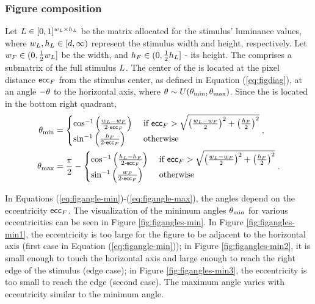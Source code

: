 \subsubsection{Figure composition}
\label{sec:figure-composition}

Let $L \in [0, 1]^{w_L \times h_L}$ be the matrix allocated for the stimulus' luminance values, where $w_L, h_L \in [d, \infty)$ represent the stimulus width and height, respectively.
Let ${w_F} \in (0, \frac{1}{2} w_L]$ be the \stimfig{} width, and ${h_F} \in (0, \frac{1}{2} h_L]$ - its height. The \stimfig{} comprises a submatrix of the full stimulus $L$. The center of the \stimfig{} is located at the pixel distance $\mathsf{ecc}_F$ from the stimulus center, as defined in Equation (\ref{eq:figdiag}), at an angle $-\theta$ to the horizontal axis, where $\theta \sim U(\theta_{\min}, \theta_{\max})$. Since the \stimfig{} is located in the bottom right quadrant,
\begin{align}
        \label{eq:figangle-min}
        \theta_{\min} &=
        \begin{cases}
            \cos^{-1} \left(
                \frac{w_L - {w_F}}{2 \cdot \mathsf{ecc}_F}
            \right)
            &\text{ if } \mathsf{ecc}_F > \sqrt{ \left( \frac{w_L - {w_F}}{2} \right)^2 + \left( \frac{{h_F}}{2} \right)^2 } \\
            \sin^{-1} \left( 
                \frac{{h_F}}{2 \cdot \mathsf{ecc}_F}
            \right)
            &\text{ otherwise}
        \end{cases}, \\
        \label{eq:figangle-max}
        \theta_{\max} &= \frac{\pi}{2} - 
        \begin{cases}
            \cos^{-1} \left(
                \frac{h_L - {h_F}}{2 \cdot \mathsf{ecc}_F}
            \right)
            &\text{ if } \mathsf{ecc}_F > \sqrt{ \left( \frac{w_L - {w_F}}{2} \right)^2 + \left( \frac{{h_F}}{2} \right)^2 } \\
            \sin^{-1} \left( 
                \frac{{w_F}}{2 \cdot \mathsf{ecc}_F}
            \right)
            &\text{ otherwise}
        \end{cases}.
\end{align}

In Equations (\ref{eq:figangle-min})-(\ref{eq:figangle-max}), the angles depend on the eccentricity $\mathsf{ecc}_F$. The visualization of the minimum angles $\theta_{\min}$ for various eccentricities can be seen in Figure \ref{fig:figangles-min}. 
In Figure \ref{fig:figangles-min1}, the eccentricity is too large for the figure to be adjacent to the horizontal axis (first case in Equation (\ref{eq:figangle-min})); 
in Figure \ref{fig:figangles-min2}, it is small enough to touch the horizontal axis and large enough to reach the right edge of the stimulus (edge case); 
in Figure \ref{fig:figangles-min3}, the eccentricity is too small to reach the edge (second case).
The maximum angle varies with eccentricity similar to the minimum angle.

